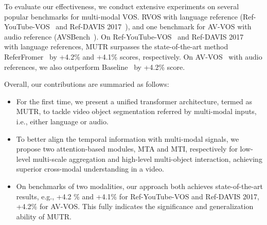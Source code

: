 \documentclass{article}
\begin{document}
To evaluate our effectiveness, we conduct extensive experiments on several popular benchmarks for multi-modal VOS.
RVOS with language reference (Ref-YouTube-VOS~\cite{seo2020urvos} and Ref-DAVIS 2017~\cite{khoreva2019video}), and one benchmark for AV-VOS with audio reference (AVSBench~\cite{zhou2022audio}). 
On Ref-YouTube-VOS~\cite{seo2020urvos} and Ref-DAVIS 2017~\cite{khoreva2019video} with language references, MUTR surpasses the state-of-the-art method ReferFromer~\cite{wu2022language} by +4.2\%  and +4.1\%  scores, respectively. On AV-VOS~\cite{zhou2022audio} with audio references, we also outperform Baseline~\cite{zhou2022audio} by +4.2\%  score.


Overall, our contributions are summaried as follows:

\begin{itemize}
   \item For the first time, we present a unified transformer architecture, termed as MUTR, to tackle video object segmentation referred by multi-modal inputs, i.e., either language or audio.

   \item To better align the temporal information with multi-modal signals, we propose two attention-based modules, MTA and MTI, respectively for low-level multi-scale aggregation and high-level multi-object interaction, achieving superior cross-modal understanding in a video.

   \item On benchmarks of two modalities, our approach both achieves state-of-the-art results, e.g., 
   +4.2 \% and +4.1\%  for Ref-YouTube-VOS  and  Ref-DAVIS 2017, +4.2\%  for AV-VOS. This fully indicates the significance and generalization ability of MUTR.

   
\end{itemize}
\end{document}
